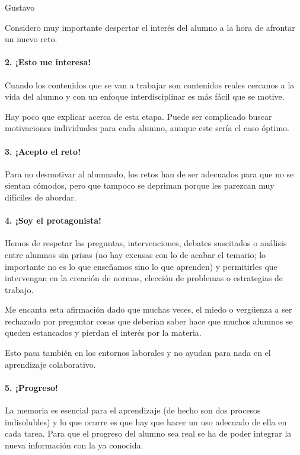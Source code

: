 \begin{opin}{\guscolor}{Gustavo}
\begin{leftbar}{\guscolor}
Considero muy importante despertar el interés del alumno a la hora de afrontar un nuevo reto.

\paragraph{2. ¡Esto me interesa!}

Cuando los contenidos que se van a trabajar son contenidos reales cercanos a la vida del alumno y con un enfoque interdisciplinar es más fácil que se motive.

Hay poco que explicar acerca de esta etapa. Puede ser complicado buscar motivaciones individuales para cada alumno, aunque este sería el caso óptimo.

\paragraph{3. ¡Acepto el reto!}

Para no desmotivar al alumnado, los retos han de ser adecuados para que no se sientan cómodos, pero que tampoco se depriman porque les parezcan muy difíciles de abordar.

\paragraph{4. ¡Soy el protagonista!}

Hemos de respetar las preguntas, intervenciones, debates suscitados o análisis entre alumnos sin prisas (no hay excusas con lo de acabar el temario; lo importante no es lo que enseñamos sino lo que aprenden) y permitirles que intervengan en la creación de normas, elección de problemas o estrategias de trabajo.

Me encanta esta afirmación dado que muchas veces, el miedo o vergüenza a ser rechazado por preguntar cosas que deberían saber hace que muchos alumnos se queden estancados y pierdan el interés por la materia.

Esto pasa también en los entornos laborales y no ayudan para nada en el aprendizaje colaborativo.

\paragraph{5. ¡Progreso!}

La memoria es esencial para el aprendizaje (de hecho son dos procesos indisolubles) y lo que ocurre es que hay que hacer un uso adecuado de ella en cada tarea. Para que el progreso del alumno sea real se ha de poder integrar la nueva información con la ya conocida.


\end{leftbar}
\end{opin}
